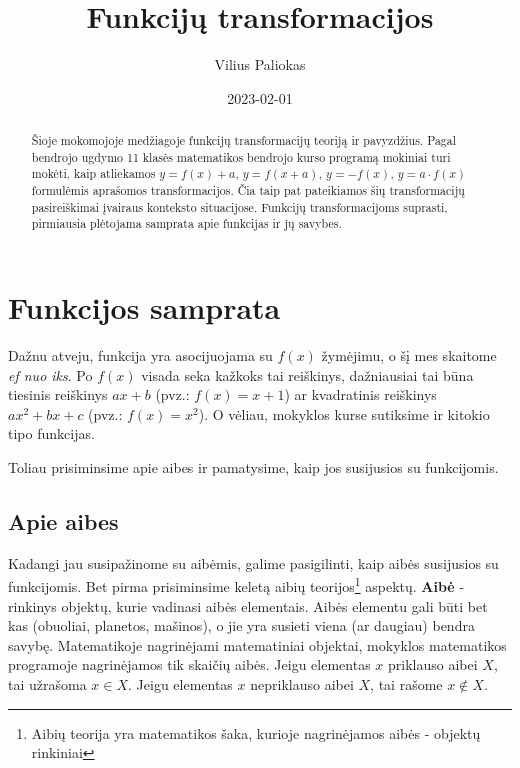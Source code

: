 \documentclass[nobib]{tufte-handout}
\title{Funkcijų transformacijos}
\author[Vilius Paliokas]{Vilius Paliokas}
\date{2023-02-01} %
\begin{document}
\maketitle%

\begin{abstract}
  \noindent
  Šioje mokomojoje medžiagoje funkcijų transformacijų teoriją ir pavyzdžius.
  Pagal bendrojo ugdymo 11 klasės matematikos bendrojo kurso programą mokiniai
  turi mokėti, kaip atliekamos $y=f(x)+a$, $y=f(x+a)$, $y=-f(x)$, $y=a\cdot
    f(x)$
  formulėmis aprašomos transformacijos. Čia taip pat pateikiamos šių
  transformacijų pasireiškimai įvairaus konteksto situacijose. Funkcijų
  transformacijoms suprasti, pirmiausia plėtojama samprata apie funkcijas ir jų
  savybes.
\end{abstract}

\section{Funkcijos samprata}\label{se c:page-layout}

Dažnu atveju, funkcija yra asocijuojama su $f(x)$ žymėjimu, o šį mes skaitome
\textit{ef nuo iks}. Po $f(x)$ visada seka kažkoks tai
reiškinys, dažniausiai tai būna tiesinis reiškinys $ax+b$ (pvz.:
$f(x)=x+1$) ar
kvadratinis reiškinys $ax^2+bx+c$ (pvz.: $f(x)=x^2$). O vėliau, mokyklos kurse
sutiksime ir kitokio
tipo funkcijas.

Toliau prisiminsime apie aibes ir pamatysime, kaip jos susijusios su
funkcijomis.

\subsection{Apie aibes}\label{sec:about_sets}

Kadangi jau susipažinome su aibėmis, galime pasigilinti, kaip aibės
susijusios su funkcijomis. Bet pirma prisiminsime keletą aibių
teorijos\footnote{Aibių teorija yra matematikos šaka, kurioje nagrinėjamos
  aibės - objektų rinkiniai} aspektų. \textbf{Aibė} - rinkinys	objektų, kurie
vadinasi aibės elementais. Aibės elementu gali būti bet kas (obuoliai,
planetos, mašinos), o jie yra susieti viena (ar daugiau) bendra
savybę. Matematikoje nagrinėjami matematiniai objektai, mokyklos matematikos
programoje nagrinėjamos
tik skaičių aibės. Jeigu elementas $x$ priklauso aibei $X$, tai užrašoma $x \in
  X$. Jeigu elementas $x$ nepriklauso aibei $X$, tai rašome $x \notin X$.
\end{document}
